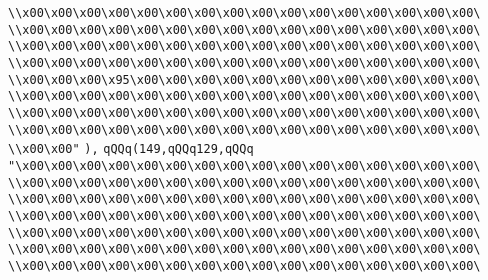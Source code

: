 \verb|\\x00\x00\x00\x00\x00\x00\x00\x00\x00\x00\x00\x00\x00\x00\x00\x00\|\newline
\verb|\\x00\x00\x00\x00\x00\x00\x00\x00\x00\x00\x00\x00\x00\x00\x00\x00\|\newline
\verb|\\x00\x00\x00\x00\x00\x00\x00\x00\x00\x00\x00\x00\x00\x00\x00\x00\|\newline
\verb|\\x00\x00\x00\x00\x00\x00\x00\x00\x00\x00\x00\x00\x00\x00\x00\x00\|\newline
\verb|\\x00\x00\x00\x95\x00\x00\x00\x00\x00\x00\x00\x00\x00\x00\x00\x00\|\newline
\verb|\\x00\x00\x00\x00\x00\x00\x00\x00\x00\x00\x00\x00\x00\x00\x00\x00\|\newline
\verb|\\x00\x00\x00\x00\x00\x00\x00\x00\x00\x00\x00\x00\x00\x00\x00\x00\|\newline
\verb|\\x00\x00\x00\x00\x00\x00\x00\x00\x00\x00\x00\x00\x00\x00\x00\x00\|\newline
\verb|\\x00\x00"|\newline
\verb|),|\newline
\verb|qQQq(149,qQQq129,qQQq|\newline
\verb|"\x00\x00\x00\x00\x00\x00\x00\x00\x00\x00\x00\x00\x00\x00\x00\x00\|\newline
\verb|\\x00\x00\x00\x00\x00\x00\x00\x00\x00\x00\x00\x00\x00\x00\x00\x00\|\newline
\verb|\\x00\x00\x00\x00\x00\x00\x00\x00\x00\x00\x00\x00\x00\x00\x00\x00\|\newline
\verb|\\x00\x00\x00\x00\x00\x00\x00\x00\x00\x00\x00\x00\x00\x00\x00\x00\|\newline
\verb|\\x00\x00\x00\x00\x00\x00\x00\x00\x00\x00\x00\x00\x00\x00\x00\x00\|\newline
\verb|\\x00\x00\x00\x00\x00\x00\x00\x00\x00\x00\x00\x00\x00\x00\x00\x00\|\newline
\verb|\\x00\x00\x00\x00\x00\x00\x00\x00\x00\x00\x00\x00\x00\x00\x00\x00\|\newline
